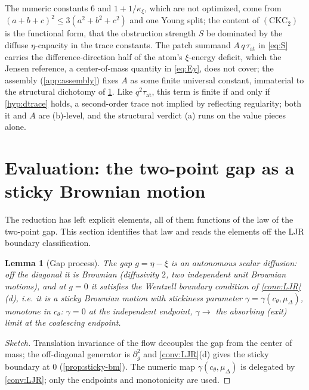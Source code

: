 \documentclass[reqno,final,11pt]{amsart}
\theoremstyle{plain}
\newtheorem{lemma}[theorem]{Lemma}
\theoremstyle{definition}
\theoremstyle{remark}
\newcommand{\muD}{\mu_{\Delta}}
\newcommand{\cth}{c_{\theta}}
\newcommand{\CKC}{(\mathrm{CKC}_{2})}
\begin{document}
The numeric constants $6$ and $1+1/\kappa_\xi$, which are not optimized, come from
$(a+b+c)^2\le3(a^2+b^2+c^2)$ and one Young split; the content of $\CKC$ is the
functional form, that the obstruction strength $S$ be dominated by the diffuse
$\eta$-capacity in the trace constants. The patch summand $A\,q\,\tau_{\mathrm{at}}$
in \eqref{eq:S} carries the difference-direction half of the atom's
$\xi$-energy deficit, which the Jensen reference, a center-of-mass quantity in
\eqref{eq:Ey}, does not cover; the assembly (\cref{app:assembly}) fixes $A$ as
some finite universal constant, immaterial to the structural dichotomy of
\cref{sec:gap}. Like $q^2\tau_{\mathrm{at}}$, this term is finite if and only if
\cref{hyp:dtrace} holds, a second-order trace not implied by reflecting
regularity; both it and $A$ are (b)-level, and the structural verdict (a) runs on
the value pieces alone.

\section{Evaluation: the two-point gap as a sticky Brownian motion}\label{sec:gap}

The reduction has left explicit elements, all of them functions of the law
of the two-point gap. This section identifies that law and reads the
elements off the LJR boundary classification.

\begin{lemma}[Gap process]\label{lem:gap-sticky}
The gap $g=\eta-\xi$ is an autonomous scalar diffusion: off the diagonal it
is Brownian (diffusivity $2$, two independent unit Brownian motions), and at
$g=0$ it satisfies the Wentzell boundary condition of \cref{conv:LJR}(d),
i.e. it is a sticky Brownian motion with stickiness parameter
$\gamma=\gamma(\cth,\muD)$, monotone in $\cth$: $\gamma=0$ at the
independent endpoint, $\gamma\to$ the absorbing (exit) limit at the
coalescing endpoint.
\end{lemma}
\begin{proof}[Sketch]
Translation invariance of the flow decouples the gap from the center of
mass; the off-diagonal generator is $\partial_g^2$ and \cref{conv:LJR}(d)
gives the sticky boundary at $0$ (\cref{prop:sticky-bm}). The numeric map
$\gamma(\cth,\muD)$ is delegated by \cref{conv:LJR}; only the endpoints and
monotonicity are used.
\end{proof}
\end{document}
